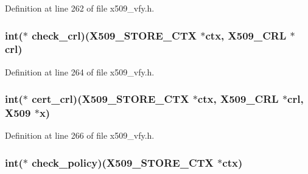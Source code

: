 Definition at line 262 of file x509\+\_\+vfy.\+h.

\subsubsection[{\texorpdfstring{check\+\_\+crl}{check_crl}}]{\setlength{\rightskip}{0pt plus 5cm}int($\ast$ check\+\_\+crl)({\bf X509\+\_\+\+S\+T\+O\+R\+E\+\_\+\+C\+TX} $\ast${\bf ctx}, {\bf X509\+\_\+\+C\+RL} $\ast$crl)}\hypertarget{structx509__store__ctx__st_a8ff691bb54a96abfec0395cc3c18af64}{}\label{structx509__store__ctx__st_a8ff691bb54a96abfec0395cc3c18af64}


Definition at line 264 of file x509\+\_\+vfy.\+h.

\subsubsection[{\texorpdfstring{cert\+\_\+crl}{cert_crl}}]{\setlength{\rightskip}{0pt plus 5cm}int($\ast$ cert\+\_\+crl)({\bf X509\+\_\+\+S\+T\+O\+R\+E\+\_\+\+C\+TX} $\ast${\bf ctx}, {\bf X509\+\_\+\+C\+RL} $\ast$crl, {\bf X509} $\ast${\bf x})}\hypertarget{structx509__store__ctx__st_a14154457f88578e298eae33987207ff0}{}\label{structx509__store__ctx__st_a14154457f88578e298eae33987207ff0}


Definition at line 266 of file x509\+\_\+vfy.\+h.

\subsubsection[{\texorpdfstring{check\+\_\+policy}{check_policy}}]{\setlength{\rightskip}{0pt plus 5cm}int($\ast$ check\+\_\+policy)({\bf X509\+\_\+\+S\+T\+O\+R\+E\+\_\+\+C\+TX} $\ast${\bf ctx})}\hypertarget{structx509__store__ctx__st_a56edc911062a79fb67984b712f887bf7}{}\label{structx509__store__ctx__st_a56edc911062a79fb67984b712f887bf7}


